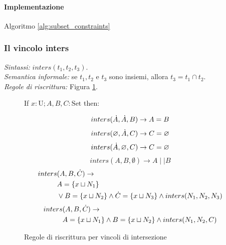 \documentclass[12pt,a4paper,openright]{book} %
\begin{document}
\paragraph{Implementazione}
Algoritmo \ref{alg:subset_constraints}

\subsubsection{Il vincolo inters}

\textit{Sintassi:} $inters(t_1,t_2,t_3)$.\\
\noindent\textit{Semantica informale:} se $t_1, t_2$ e $t_3$ sono insiemi, allora $t_3 = t_1 \cap t_2$.\\
\noindent\textit{Regole di riscrittura:} Figura \ref{fig:intersect_constraints}.

\begin{figure}
	\begin{tcolorbox}[colframe=black, colback=white, sharp corners]
		\setcounter{equation}{7}
		\renewcommand{\theequation}{$\cup$\textsubscript{\arabic{equation}}}

		If $x: \text{U}; A, B, C: \text{Set}$ then:

		\begin{equation}
		inters(\dot{A}, \dot{A}, B) \to A = B
		\end{equation}
		\begin{equation}
		inters(\varnothing, \dot{A}, C) \to C = \varnothing
		\end{equation}
		\begin{equation}
		inters(\dot{A}, \varnothing, C) \to C = \varnothing
		\end{equation}
		\begin{equation}
		inters(A,B,\emptyset) \to A \mid\mid B
		\end{equation}
		\begin{equation}
		\begin{split}
		inters & (A,B,\dot{C}) \to \\
		& A = \{ x \sqcup N_1 \} \\
		& \lor B = \{ x \sqcup N_2 \} \land \dot{C} = \{ x \sqcup N_3 \} \land inters(N_1, N_2, N_3)
		\end{split}
		\end{equation}
		\begin{equation}
		\begin{split}
		inters & (A,B,\dot{C}) \to \\
		& A = \{ x \sqcup N_1 \} \land B = \{ x \sqcup N_2 \} \land inters(N_1, N_2, C)
		\end{split}
		\end{equation}

	\end{tcolorbox}

	\caption{Regole di riscrittura per vincoli di intersezione}
	\label{fig:intersect_constraints}
\end{figure}
\end{document}
